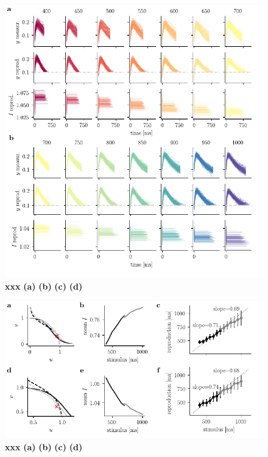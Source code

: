 \documentclass[10pt]{article}
\begin{document}
\begin{figure}[ht]
	\centering
	\includegraphics{figures/supp_experiment_high.pdf}
	\caption{\textbf{xxx}
	\textbf{(a)}
	\textbf{(b)}
	\textbf{(c)} 
	\textbf{(d)} 
	}
\label{sup:experiment_high}
\end{figure}

\begin{figure}[ht]
	\centering
	\includegraphics{figures/supp_comparison.pdf}
	\caption{\textbf{xxx}
	\textbf{(a)}
	\textbf{(b)}
	\textbf{(c)} 
	\textbf{(d)} 
	}
\label{sup:comparison}
\end{figure}
\end{document}
